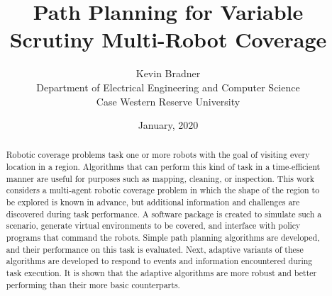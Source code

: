 \title{Path Planning for Variable Scrutiny Multi-Robot Coverage}

\author{Kevin Bradner\\Department of Electrical Engineering and Computer Science\\Case Western Reserve University}
\date{January, 2020}
\maketitle

\tableofcontents

\listoftables

\listoffigures

\begin{abstract}
Robotic coverage problems task one or more robots with the goal of visiting every location in a region. Algorithms that can perform this kind of task in a time-efficient manner are useful for purposes such as mapping, cleaning, or inspection. This work considers a multi-agent robotic coverage problem in which the shape of the region to be explored is known in advance, but additional information and challenges are discovered during task performance. A software package is created to simulate such a scenario, generate virtual environments to be covered, and interface with policy programs that command the robots. Simple path planning algorithms are developed, and their performance on this task is evaluated. Next, adaptive variants of these algorithms are developed to respond to events and information encountered during task execution. It is shown that the adaptive algorithms are more robust and better performing than their more basic counterparts.
\end{abstract}